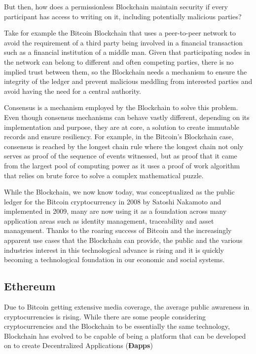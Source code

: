   But then, how does a permissionless Blockchain maintain security if every
  participant has access to writing on it, including potentially malicious
  parties?

  Take for example the Bitcoin Blockchain that uses a peer-to-peer network to
  avoid the requirement of a third party being involved in a financial
  transaction such as a financial institution of a middle man.
  \cite{Nakamoto2008} Given that participating nodes in the network can belong
  to different and often competing parties, there is no implied trust between
  them, so the Blockchain needs a mechanism to ensure the integrity of the
  ledger and prevent malicious meddling from interested parties and avoid
  having the need for a central authority.\cite{Barclay2017}

  Consensus is a mechanism employed by the Blockchain to solve this problem.
  Even though consensus mechanisms can behave vastly different, depending on
  its implementation and purpose, they are at core, a solution to create
  immutable records and ensure resiliency.  For example, in the Bitcoin's
  Blockchain case, consensus is reached by the longest chain rule where the
  longest chain not only serves as proof of the sequence of events witnessed,
  but as proof that it came from the largest pool of computing power as it uses
  a proof of work algorithm that relies on brute force to solve a complex
  mathematical puzzle.\cite{Baars2016,Wood2017}

  While the Blockchain, we now know today, was conceptualized as the public
  ledger for the Bitcoin cryptocurrency in 2008 by Satoshi Nakamoto and
  implemented in 2009, many are now using it as a foundation across many
  application areas such as identity management, traceability and asset
  management. \cite{MIT2016} Thanks to the roaring success of Bitcoin and the
  increasingly apparent use cases that the Blockchain can provide, the public
  and the various industries interest in this technological advance is rising
  and it is quickly becoming a technological foundation in our economic and
  social systems. \cite{Zago2018, Marr2018,Long2018}

  \subsection{Ethereum}

  Due to Bitcoin getting extensive media coverage, the average public awareness
  in cryptocurrencies is rising. \cite{BitAwareness2017} While there are some
  people considering cryptocurrencies and the Blockchain to be essentially the
  same technology, Blockchain has evolved to be capable of being a platform
  that can be developed on to create Decentralized Applications
  (\textbf{Ðapps})

